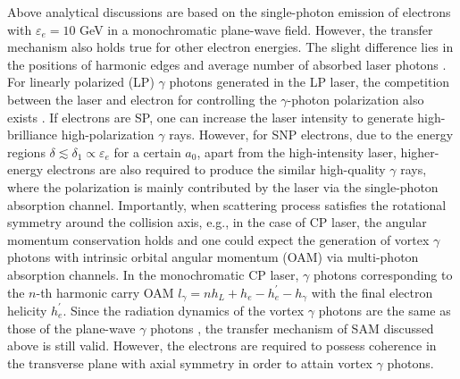 \documentclass[10pt,twocolumn,showpacs,amsmath,amssymb,floatfix,superscriptaddress]{revtex4-2}
\begin{document}
Above analytical discussions are based on the single-photon emission of electrons with $\varepsilon_e =10$ GeV in a monochromatic plane-wave field. However, the transfer mechanism also holds true for other electron energies. The slight difference lies in the positions of harmonic edges and average number of absorbed laser photons \cite{Supplemental}. For linearly polarized (LP) $\gamma$ photons generated in the LP laser, the competition between the laser and electron for controlling the $\gamma$-photon polarization also exists \cite{Supplemental}. If electrons are SP, one can increase the laser intensity  to generate high-brilliance high-polarization $\gamma$ rays. However, for SNP electrons, due to the energy regions $\delta \lesssim \delta_1 \propto \varepsilon_{e}$ for a certain $a_0$, apart from the high-intensity laser, higher-energy electrons are also required to produce the similar high-quality $\gamma$ rays, where the polarization is mainly contributed by the laser via the single-photon absorption channel. Importantly, when scattering process satisfies the rotational symmetry around the collision axis, e.g., in the case of CP laser, the angular momentum conservation holds and one could expect the generation of vortex $\gamma$ photons with intrinsic orbital angular momentum (OAM) via multi-photon absorption channels. In the monochromatic CP laser, $\gamma$ photons corresponding to the $n$-th harmonic carry OAM $l_\gamma=n h_L + h_e - h^\prime_{e}-h_\gamma$ with the final electron helicity $h^\prime_{e}$. Since the radiation dynamics of the vortex $\gamma$ photons are the same as those of the plane-wave $\gamma$ photons \cite{Ababekri2022}, the transfer mechanism of SAM discussed above is still valid. However, the electrons are required to possess coherence in the transverse plane with axial symmetry in order to attain vortex $\gamma$ photons.   
\end{document}
